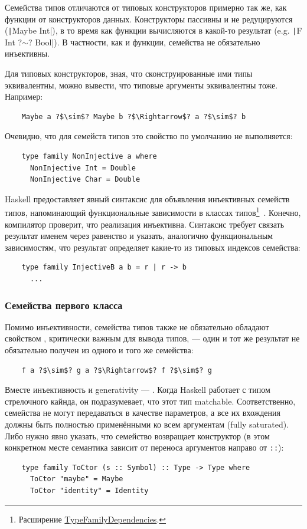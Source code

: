 Семейства типов отличаются от типовых конструкторов примерно так же, как функции от конструкторов данных.
Конструкторы пассивны и не редуцируются (\texttt|Maybe Int|), в то время как функции вычисляются в какой-то результат (e.g. \texttt|F Int ?$\sim$? Bool|).
В частности, как и функции, семейства не обязательно инъективны.

Для типовых конструкторов, зная, что сконструированные ими типы эквивалентны, можно вывести, что типовые аргументы эквивалентны тоже.
Например:
\begin{verbatim}
    Maybe a ?$\sim$? Maybe b ?$\Rightarrow$? a ?$\sim$? b
\end{verbatim}

Очевидно, что для семейств типов это свойство по умолчанию не выполняется:
\begin{verbatim}
    type family NonInjective a where
      NonInjective Int = Double
      NonInjective Char = Double
\end{verbatim}

Haskell предоставляет явный синтаксис для объявления инъективных семейств типов, напоминающий функциональные зависимости в классах типов\footnote{Расширение \href{https://ghc.gitlab.haskell.org/ghc/doc/users_guide/exts/type_families.html\#extension-TypeFamilyDependencies}{TypeFamilyDependencies}.}~\cite{stolarek2015injective}.
Конечно, компилятор проверит, что реализация инъективна.
Синтаксис требует связать результат именем через равенство и указать, аналогично функциональным зависимостям, что результат определяет какие-то из типовых индексов семейства:
\begin{verbatim}
    type family InjectiveB a b = r | r -> b
      ...
\end{verbatim}

\subsubsection{Семейства первого класса}

Помимо инъективности, семейства типов также не обязательно обладают свойством , критически важным для вывода типов, --- один и тот же результат не обязательно получен из одного и того же семейства:
\begin{verbatim}
    f a ?$\sim$? g a ?$\Rightarrow$? f ?$\sim$? g
\end{verbatim}

Вместе инъективность и generativity --- .
Когда Haskell работает с типом стрелочного кайнда, он подразумевает, что этот тип matchable.
Соответственно, семейства не могут передаваться в качестве параметров, а все их вхождения должны быть полностью применёнными ко всем аргументам (fully saturated).
Либо нужно явно указать, что семейство возвращает конструктор (в этом конкретном месте семантика зависит от переноса аргументов направо от \texttt{::}):
\begin{verbatim}
    type family ToCtor (s :: Symbol) :: Type -> Type where
      ToCtor "maybe" = Maybe
      ToCtor "identity" = Identity
\end{verbatim}

